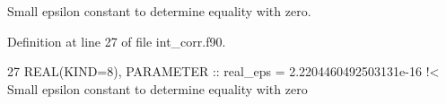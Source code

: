 Small epsilon constant to determine equality with zero. 



Definition at line 27 of file int\+\_\+corr.\+f90.


\begin{DoxyCode}
27   \textcolor{keywordtype}{REAL(KIND=8)}, \textcolor{keywordtype}{PARAMETER} :: real\_eps = 2.2204460492503131e-16 \textcolor{comment}{!< Small epsilon constant to determine
       equality with zero}
\end{DoxyCode}
